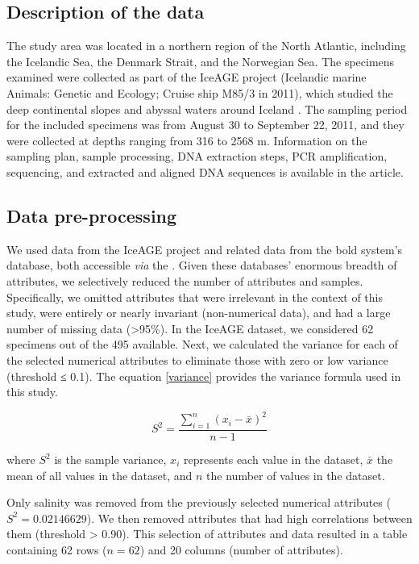 \subsection{Description of the data}
The study area was located in a northern region of the North Atlantic, including the Icelandic Sea, the Denmark Strait, and the Norwegian Sea. The specimens examined were collected as part of the IceAGE project (Icelandic marine Animals: Genetic and Ecology; Cruise ship M85/3 in 2011), which studied the deep continental slopes and abyssal waters around Iceland \citep{meisner_prefacebiodiversity_2018}. The sampling period for the included specimens was from August 30 to September 22, 2011, and they were collected at depths ranging from 316 to 2568 m. Information on the sampling plan, sample processing, DNA extraction steps, PCR amplification, sequencing, and extracted and aligned DNA sequences is available in the \citep{uhlir_adding_2021} article.

\subsection{Data pre-processing}
We used data from the IceAGE project and related data from the bold system's database, both accessible \emph{via} the \citep{uhlir_adding_2021}. Given these databases' enormous breadth of attributes, we selectively reduced the number of attributes and samples. Specifically, we omitted attributes that were irrelevant in the context of this study, were entirely or nearly invariant (non-numerical data), and had a large number of missing data (>95\%). In the IceAGE dataset, we considered 62 specimens out of the 495 available. Next, we calculated the variance for each of the selected numerical attributes to eliminate those with zero or low variance (threshold ≤ 0.1). The equation \ref{variance} provides the variance formula used in this study.

\begin{equation}\label{variance}
    S^2 = \frac{\sum_{i=1}^{n} (x_i - \bar{x})^2}{n-1}
\end{equation}

where $S^2$ is the sample variance, $x_i$ represents each value in the dataset, $\bar{x}$ the mean of all values in the dataset, and $n$ the number of values in the dataset.

Only salinity was removed from the previously selected numerical attributes ($S^2 = 0.02146629$). We then removed attributes that had high correlations between them (threshold > 0.90). This selection of attributes and data resulted in a table containing 62 rows ($n=62$) and 20 columns (number of attributes). 


